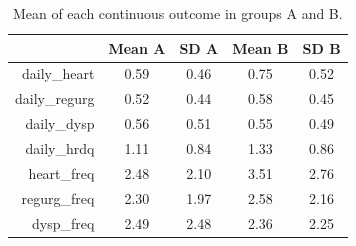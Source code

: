 \documentclass[12pt]{article}
\begin{document}
\begin{table}\label{tab:clinical_distr}
\centering
\begin{tabular}{r|cc|cc}
  \hline
 & Mean A & SD A & Mean B & SD B \\ 
  \hline
daily\_heart & 0.59 & 0.46 & 0.75 & 0.52 \\ 
  daily\_regurg & 0.52 & 0.44 & 0.58 & 0.45 \\ 
  daily\_dysp & 0.56 & 0.51 & 0.55 & 0.49 \\ 
  daily\_hrdq & 1.11 & 0.84 & 1.33 & 0.86 \\ 
  heart\_freq & 2.48 & 2.10 & 3.51 & 2.76 \\ 
  regurg\_freq & 2.30 & 1.97 & 2.58 & 2.16 \\ 
  dysp\_freq & 2.49 & 2.48 & 2.36 & 2.25 \\ 
   \hline
\end{tabular}
\caption{Mean of each continuous outcome in groups A and B.} 
\end{table}
\end{document}
